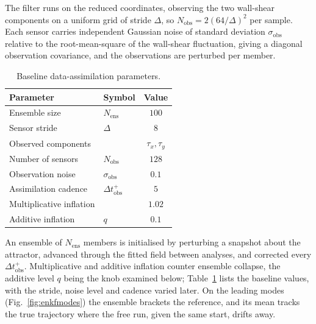 \documentclass[pdflatex,sn-basic]{sn-jnl}
\theoremstyle{thmstyleone}%
\theoremstyle{thmstyletwo}%
\theoremstyle{thmstylethree}%
\begin{document}
The filter runs on the reduced coordinates, observing the two wall-shear components
on a uniform grid of stride $\Delta$, so $N_{\mathrm{obs}}=2(64/\Delta)^2$ per
sample. Each sensor carries independent Gaussian noise of standard deviation
$\sigma_{\mathrm{obs}}$ relative to the root-mean-square of the wall-shear
fluctuation, giving a diagonal observation covariance, and the observations are
perturbed per member.
\begin{table}[t]
	\centering
	\caption{Baseline data-assimilation parameters.}
	\label{tab:enkf}
	\begin{tabular}{llc}
		\toprule
		Parameter & Symbol & Value \\
		\midrule
		Ensemble size & $N_{\mathrm{ens}}$ & $100$ \\
		Sensor stride & $\Delta$ & $8$ \\
		Observed components & & $\tau_x,\tau_y$ \\
		Number of sensors & $N_{\mathrm{obs}}$ & $128$ \\
		Observation noise & $\sigma_{\mathrm{obs}}$ & $0.1$ \\
		Assimilation cadence & $\Delta t_{\mathrm{obs}}^+$ & $5$ \\
		Multiplicative inflation & & $1.02$ \\
		Additive inflation & $q$ & $0.1$ \\
		\bottomrule
	\end{tabular}
\end{table}
An ensemble of $N_{\mathrm{ens}}$ members is initialised by perturbing a snapshot
about the attractor, advanced through the fitted field between analyses, and
corrected every $\Delta t_{\mathrm{obs}}^+$. Multiplicative and additive inflation
counter ensemble collapse, the additive level $q$ being the knob examined below;
Table~\ref{tab:enkf} lists the baseline values, with the stride, noise level and
cadence varied later. On the leading modes (Fig.~\ref{fig:enkfmodes}) the ensemble
brackets the reference, and its mean tracks the true trajectory where the free run,
given the same start, drifts away.
\end{document}
